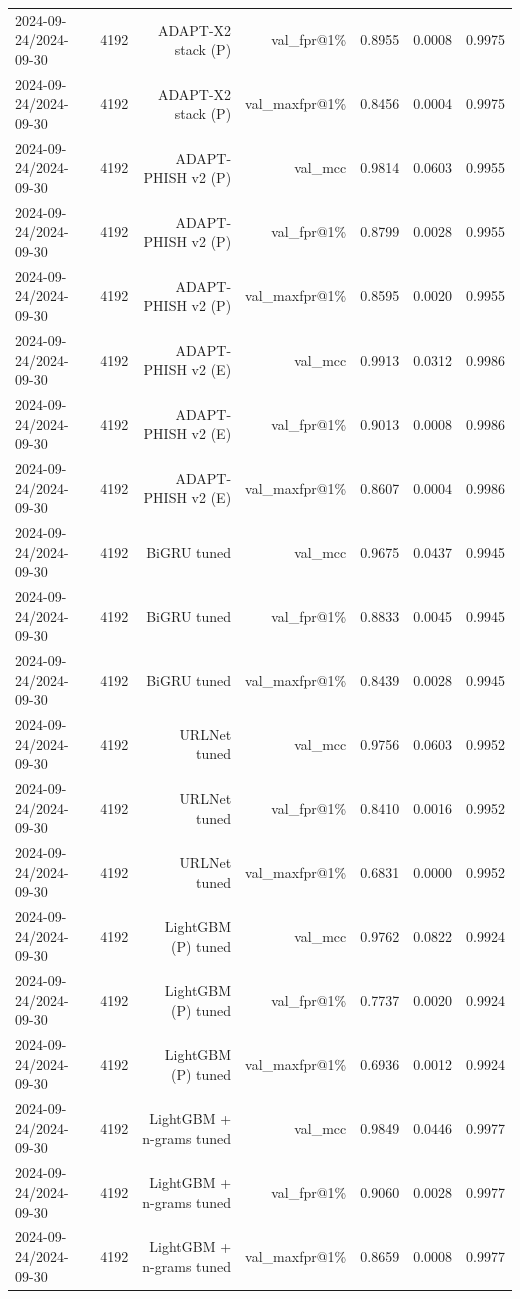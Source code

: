 \begin{table}[t]
\begin{tabular}{llrrrrr}
2024-09-24/2024-09-30 & 4192 & ADAPT-X2 stack (P) & val\_fpr@1\% & 0.8955 & 0.0008 & 0.9975 \\
2024-09-24/2024-09-30 & 4192 & ADAPT-X2 stack (P) & val\_maxfpr@1\% & 0.8456 & 0.0004 & 0.9975 \\
2024-09-24/2024-09-30 & 4192 & ADAPT-PHISH v2 (P) & val\_mcc & 0.9814 & 0.0603 & 0.9955 \\
2024-09-24/2024-09-30 & 4192 & ADAPT-PHISH v2 (P) & val\_fpr@1\% & 0.8799 & 0.0028 & 0.9955 \\
2024-09-24/2024-09-30 & 4192 & ADAPT-PHISH v2 (P) & val\_maxfpr@1\% & 0.8595 & 0.0020 & 0.9955 \\
2024-09-24/2024-09-30 & 4192 & ADAPT-PHISH v2 (E) & val\_mcc & 0.9913 & 0.0312 & 0.9986 \\
2024-09-24/2024-09-30 & 4192 & ADAPT-PHISH v2 (E) & val\_fpr@1\% & 0.9013 & 0.0008 & 0.9986 \\
2024-09-24/2024-09-30 & 4192 & ADAPT-PHISH v2 (E) & val\_maxfpr@1\% & 0.8607 & 0.0004 & 0.9986 \\
2024-09-24/2024-09-30 & 4192 & BiGRU tuned & val\_mcc & 0.9675 & 0.0437 & 0.9945 \\
2024-09-24/2024-09-30 & 4192 & BiGRU tuned & val\_fpr@1\% & 0.8833 & 0.0045 & 0.9945 \\
2024-09-24/2024-09-30 & 4192 & BiGRU tuned & val\_maxfpr@1\% & 0.8439 & 0.0028 & 0.9945 \\
2024-09-24/2024-09-30 & 4192 & URLNet tuned & val\_mcc & 0.9756 & 0.0603 & 0.9952 \\
2024-09-24/2024-09-30 & 4192 & URLNet tuned & val\_fpr@1\% & 0.8410 & 0.0016 & 0.9952 \\
2024-09-24/2024-09-30 & 4192 & URLNet tuned & val\_maxfpr@1\% & 0.6831 & 0.0000 & 0.9952 \\
2024-09-24/2024-09-30 & 4192 & LightGBM (P) tuned & val\_mcc & 0.9762 & 0.0822 & 0.9924 \\
2024-09-24/2024-09-30 & 4192 & LightGBM (P) tuned & val\_fpr@1\% & 0.7737 & 0.0020 & 0.9924 \\
2024-09-24/2024-09-30 & 4192 & LightGBM (P) tuned & val\_maxfpr@1\% & 0.6936 & 0.0012 & 0.9924 \\
2024-09-24/2024-09-30 & 4192 & LightGBM + n-grams tuned & val\_mcc & 0.9849 & 0.0446 & 0.9977 \\
2024-09-24/2024-09-30 & 4192 & LightGBM + n-grams tuned & val\_fpr@1\% & 0.9060 & 0.0028 & 0.9977 \\
2024-09-24/2024-09-30 & 4192 & LightGBM + n-grams tuned & val\_maxfpr@1\% & 0.8659 & 0.0008 & 0.9977 \\

\end{tabular}
\end{table}
